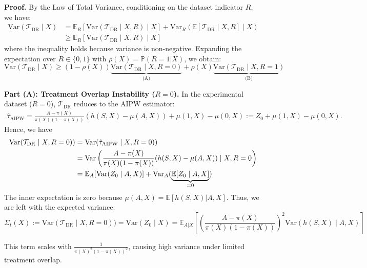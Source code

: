\documentclass{article}
\theoremstyle{plain}
\theoremstyle{definition}
\theoremstyle{remark}
\newcommand{\var}{\mathrm{Var}}            %
\newcommand{\1}{\mathds{1}}                %
\begin{document}
\textbf{Proof.}
By the Law of Total Variance, conditioning on the dataset indicator $R$, we have:
\begin{align}
    \var(\mathcal{T}_{\mathrm{DR}} \mid X) &= \mathbb{E}_R[\var(\mathcal{T}_{\mathrm{DR}} \mid X, R) \mid X] + \var_R(\mathbb{E}[\mathcal{T}_{\mathrm{DR}} \mid X, R] \mid X) \\
    &\geq \mathbb{E}_R[\var(\mathcal{T}_{\mathrm{DR}} \mid X, R) \mid X]
\end{align}
where the inequality holds because variance is non-negative. Expanding the expectation over $R \in \{0, 1\}$ with $\rho(X) = \mathbb{P}(R=1|X)$, we obtain:
\begin{equation}
    \var(\mathcal{T}_{\mathrm{DR}} \mid X) \geq (1-\rho(X)) \underbrace{\var(\mathcal{T}_{\mathrm{DR}} \mid X, R=0)}_{\text{(A)}} + \rho(X) \underbrace{\var(\mathcal{T}_{\mathrm{DR}} \mid X, R=1)}_{\text{(B)}} \label{eq:total_var}
\end{equation}

\textbf{Part (A): Treatment Overlap Instability ($R=0$).}
In the experimental dataset ($R=0$), $\mathcal{T}_{\mathrm{DR}}$ reduces to the AIPW estimator:
\begin{align}
    \hat\tau_{\mathrm{AIPW}}=\frac{A-\pi(X)}{\pi(X)(1-\pi(X))}(h(S,X) - \mu(A,X)) + \mu(1,X)-\mu(0,X):=Z_0 + \mu(1,X)-\mu(0,X).
\end{align}
Hence, we have
\begin{align}
    \var(\mathcal{T}_{\mathrm{DR}} \mid X, R=0)) &= \var(\hat\tau_{\mathrm{AIPW}} \mid X, R=0)) \notag \\
    &= \var\left(\frac{A-\pi(X)}{\pi(X)(1-\pi(X))}(h(S,X) - \mu(A,X))\mid X, R=0\right) \notag \\
    &= \mathbb{E}_{A}[\text{Var}(Z_0 \mid A, X)] + \text{Var}_{A}(\underbrace{\mathbb{E}[Z_0 \mid A, X]}_{=0})
\end{align}
The inner expectation is zero because $\mu(A,X) = \mathbb{E}[h(S,X)|A,X]$. Thus, we are left with the expected variance:
\begin{equation}
\label{Sigma_t}
    \Sigma_t(X) := \var(\mathcal{T}_{\mathrm{DR}} \mid X, R=0))=\var(Z_0 \mid X) = \mathbb{E}_{A|X} \left[ \left( \frac{A-\pi(X)}{\pi(X)(1-\pi(X))} \right)^2 \var(h(S,X) \mid A, X) \right]
\end{equation}

This term scales with $\frac{1}{\pi(X)^2(1-\pi(X))^2}$, causing high variance under limited treatment overlap.
\end{document}
